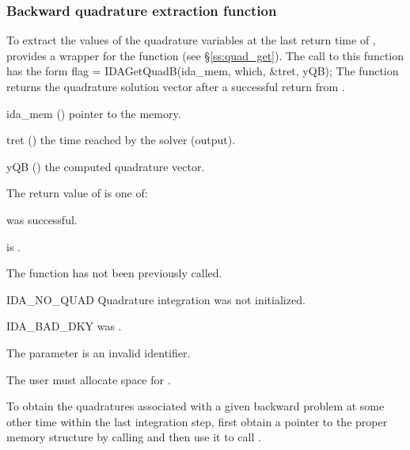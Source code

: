 \subsubsection{Backward quadrature extraction function}
\label{sss:quad_get_b}
To extract the values of the quadrature variables at the last return time
of , {\idas} provides a wrapper for the function 
(see \S\ref{ss:quad_get}). The call to this function has the form
{
  flag = IDAGetQuadB(ida\_mem, which, \&tret, yQB);
}
{
  The function  returns the quadrature solution vector after
  a successful return from .
}
{
  \begin{args}
  \item[ida\_mem] ()
    pointer to the {\idas} memory.
  \item[tret] ()
    the time reached by the solver (output).
  \item[yQB] ()
    the computed quadrature vector.
  \end{args}
}
{
  The return value  of  is one of:
  \begin{args}
  \item[\Id{IDA\_SUCCESS}]
     was successful.
  \item[\Id{IDA\_MEM\_NULL}]
     is .
  \item[\Id{IDA\_NO\_ADJ}]
    The function  has not been previously called.
  \item[IDA\_NO\_QUAD]
    Quadrature integration was not initialized.
  \item[IDA\_BAD\_DKY]
     was .
  \item[\Id{IDA\_ILL\_INPUT}]
    The parameter  is an invalid identifier.
  \end{args}
}
{
  {\warn}The user must allocate space for .

  To obtain the quadratures associated with a given backward problem at some
  other time within the last integration step, first obtain a pointer to the
  proper {\idas} memory structure by calling 
  and then use it to call .
}

